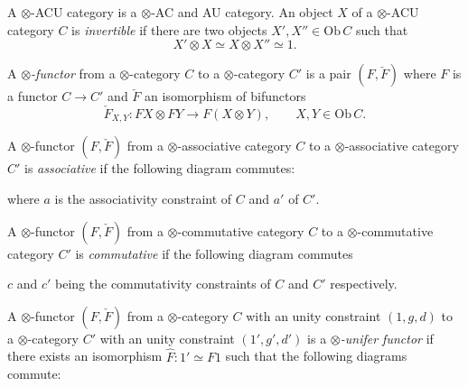 \documentclass[11pt,a4paper]{article}
\begin{document}
A $\otimes$-ACU category is a $\otimes$-AC and AU category. An object $X$
of a $\otimes$-ACU category $C$ is \emph{invertible} if there are two
objects $X', X'' \in \mathrm{Ob}\,C$ such that
\[
X' \otimes X \simeq X \otimes X'' \simeq 1.
\]

A \emph{$\otimes$-functor} from a $\otimes$-category $C$ to a
$\otimes$-category $C'$ is a pair $(F, \check{F})$ where $F$ is a functor
$C \to C'$ and $\check{F}$ an isomorphism of bifunctors
\[
\check{F}_{X,Y} : FX \otimes FY \longrightarrow F(X \otimes Y), \qquad
X, Y \in \mathrm{Ob}\,C.
\]

A $\otimes$-functor $(F, \check{F})$ from a $\otimes$-associative category
$C$ to a $\otimes$-associative category $C'$ is \emph{associative} if the
following diagram commutes:


where $a$ is the associativity constraint of $C$ and $a'$ of $C'$.

A $\otimes$-functor $(F, \check{F})$ from a $\otimes$-commutative category
$C$ to a $\otimes$-commutative category $C'$ is \emph{commutative} if the
following diagram commutes


$c$ and $c'$ being the commutativity constraints of $C$ and $C'$
respectively.

A $\otimes$-functor $(F, \check{F})$ from a $\otimes$-category $C$ with an
unity constraint $(1, g, d)$ to a $\otimes$-category $C'$ with an unity
constraint $(1', g', d')$ is a \emph{$\otimes$-unifer functor} if there
exists an isomorphism $\hat{F} : 1' \simeq F1$ such that the following
diagrams commute:
\end{document}
